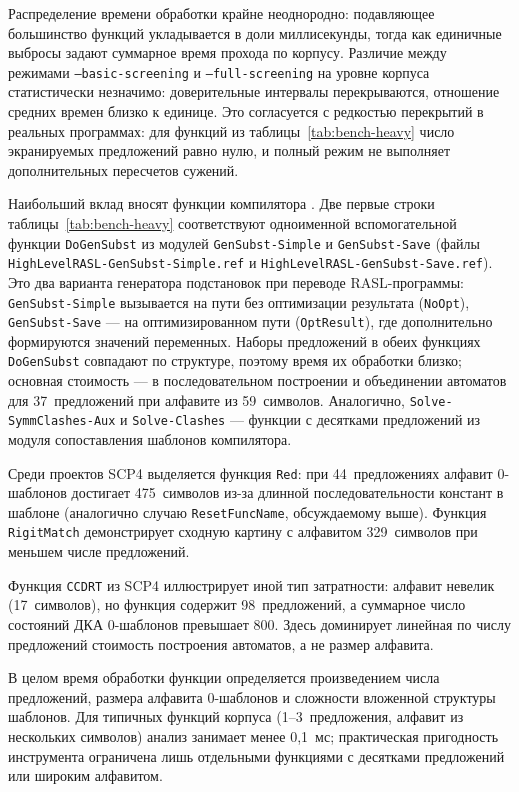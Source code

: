 Распределение времени обработки крайне неоднородно: подавляющее большинство функций укладывается в доли миллисекунды, тогда как единичные выбросы задают суммарное время прохода по корпусу.
Различие между режимами \texttt{--basic-screening} и \texttt{--full-screening} на уровне корпуса статистически незначимо: доверительные интервалы перекрываются, отношение средних времен близко к единице.
Это согласуется с редкостью перекрытий в реальных программах: для функций из таблицы~\ref{tab:bench-heavy} число экранируемых предложений равно нулю, и полный режим не выполняет дополнительных пересчетов сужений.

Наибольший вклад вносят функции компилятора \RL{}.
Две первые строки таблицы~\ref{tab:bench-heavy} соответствуют одноименной вспомогательной функции \texttt{DoGenSubst} из модулей \texttt{GenSubst-Simple} и \texttt{GenSubst-Save} (файлы \texttt{HighLevelRASL-GenSubst-Simple.ref} и \texttt{HighLevelRASL-GenSubst-Save.ref}).
Это два варианта генератора подстановок при переводе RASL-программы: \texttt{GenSubst-Simple} вызывается на пути без оптимизации результата (\texttt{NoOpt}), \texttt{GenSubst-Save} --- на оптимизированном пути (\texttt{OptResult}), где дополнительно формируются  значений переменных.
Наборы предложений в обеих функциях \texttt{DoGenSubst} совпадают по структуре, поэтому время их обработки близко; основная стоимость --- в последовательном построении и объединении автоматов для 37~предложений при алфавите из 59~символов.
Аналогично, \texttt{Solve-SymmClashes-Aux} и \texttt{Solve-Clashes} --- функции с десятками предложений из модуля сопоставления шаблонов компилятора.

Среди проектов SCP4 выделяется функция \texttt{Red}: при 44~предложениях алфавит 0-шаблонов достигает 475~символов из-за длинной последовательности констант в шаблоне (аналогично случаю \texttt{ResetFuncName}, обсуждаемому выше).
Функция \texttt{RigitMatch} демонстрирует сходную картину с алфавитом 329~символов при меньшем числе предложений.

Функция \texttt{CCDRT} из SCP4 иллюстрирует иной тип затратности: алфавит невелик (17~символов), но функция содержит 98~предложений, а суммарное число состояний ДКА 0-шаблонов превышает 800.
Здесь доминирует линейная по числу предложений стоимость построения автоматов, а не размер алфавита.

В целом время обработки функции определяется произведением числа предложений, размера алфавита 0-шаблонов и сложности вложенной структуры шаблонов.
Для типичных функций корпуса (1--3~предложения, алфавит из нескольких символов) анализ занимает менее 0{,}1~мс; практическая пригодность инструмента ограничена лишь отдельными  функциями с десятками предложений или широким алфавитом.

